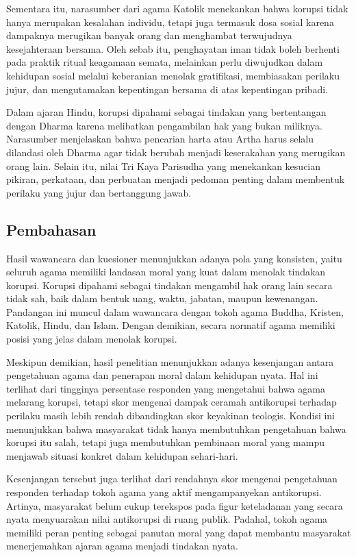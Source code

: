 Sementara itu, narasumber dari agama Katolik menekankan bahwa korupsi tidak hanya merupakan kesalahan individu, tetapi juga termasuk dosa sosial karena dampaknya merugikan banyak orang dan menghambat terwujudnya kesejahteraan bersama. Oleh sebab itu, penghayatan iman tidak boleh berhenti pada praktik ritual keagamaan semata, melainkan perlu diwujudkan dalam kehidupan sosial melalui keberanian menolak gratifikasi, membiasakan perilaku jujur, dan mengutamakan kepentingan bersama di atas kepentingan pribadi. 

Dalam ajaran Hindu, korupsi dipahami sebagai tindakan yang bertentangan dengan Dharma karena melibatkan pengambilan hak yang bukan miliknya. Narasumber menjelaskan bahwa pencarian harta atau Artha harus selalu dilandasi oleh Dharma agar tidak berubah menjadi keserakahan yang merugikan orang lain. Selain itu, nilai Tri Kaya Parisudha yang menekankan kesucian pikiran, perkataan, dan perbuatan menjadi pedoman penting dalam membentuk perilaku yang jujur dan bertanggung jawab. 

\subsection{Pembahasan}
Hasil wawancara dan kuesioner menunjukkan adanya pola yang konsisten, yaitu seluruh agama memiliki landasan moral yang kuat dalam menolak tindakan korupsi. Korupsi dipahami sebagai tindakan mengambil hak orang lain secara tidak sah, baik dalam bentuk uang, waktu, jabatan, maupun kewenangan. Pandangan ini muncul dalam wawancara dengan tokoh agama Buddha, Kristen, Katolik, Hindu, dan Islam. Dengan demikian, secara normatif agama memiliki posisi yang jelas dalam menolak korupsi.

Meskipun demikian, hasil penelitian menunjukkan adanya kesenjangan antara pengetahuan agama dan penerapan moral dalam kehidupan nyata. Hal ini terlihat dari tingginya persentase responden yang mengetahui bahwa agama melarang korupsi, tetapi skor mengenai dampak ceramah antikorupsi terhadap perilaku masih lebih rendah dibandingkan skor keyakinan teologis. Kondisi ini menunjukkan bahwa masyarakat tidak hanya membutuhkan pengetahuan bahwa korupsi itu salah, tetapi juga membutuhkan pembinaan moral yang mampu menjawab situasi konkret dalam kehidupan sehari-hari.

Kesenjangan tersebut juga terlihat dari rendahnya skor mengenai pengetahuan responden terhadap tokoh agama yang aktif mengampanyekan antikorupsi. Artinya, masyarakat belum cukup terekspos pada figur keteladanan yang secara nyata menyuarakan nilai antikorupsi di ruang publik. Padahal, tokoh agama memiliki peran penting sebagai panutan moral yang dapat membantu masyarakat menerjemahkan ajaran agama menjadi tindakan nyata.

